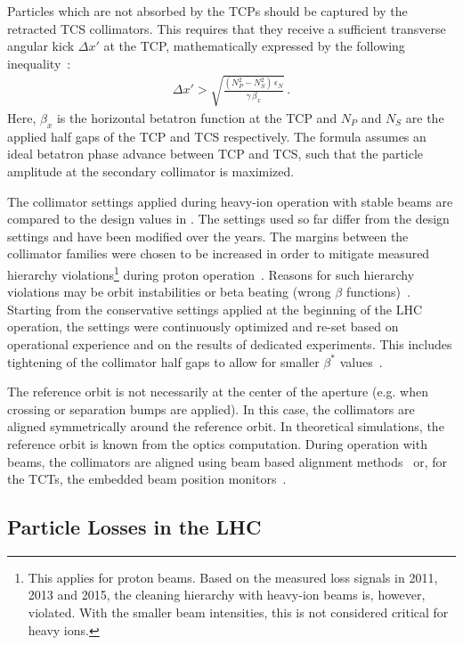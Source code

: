 Particles which are not absorbed by the TCPs should be captured by the retracted TCS collimators. This requires that they receive a sufficient transverse angular kick $\Delta x'$ at the TCP, mathematically expressed by the following inequality~\cite{ICOSIMref02}:
%
\begin{align}
  \Delta x' > \sqrt{\frac{(N_P^2 - N_S^2) \, \epsilon_N }{ \gamma \, \beta_x } } \,. \label{dx:secon}
\end{align}
%
Here, $\beta_x$ is the horizontal betatron function at the TCP and $N_P$ and $N_S$ are the applied half gaps of the TCP and TCS respectively. The formula assumes an ideal betatron phase advance between TCP and TCS, such that the particle amplitude at the secondary collimator is maximized.
%

The collimator settings applied during heavy-ion operation with stable beams are compared to the design values in . The settings used so far differ from the design settings and have been modified over the years. The margins between the collimator families were chosen to be increased in order to mitigate measured hierarchy violations\footnote{This applies for proton beams. Based on the measured loss signals in 2011, 2013 and 2015, the cleaning hierarchy with heavy-ion beams is, however, violated. With the smaller beam intensities, this is not considered critical for heavy ions.} during proton operation~\cite{Bruce2014a}. Reasons for such hierarchy violations may be orbit instabilities or beta beating (wrong $\beta$ functions)~\cite{CERN-ATS-NOTE-2011-036MD}. Starting from the conservative settings applied at the beginning of the LHC operation, the settings were continuously optimized and re-set based on operational experience and on the results of dedicated experiments. This includes tightening of the collimator half gaps to allow for smaller $\beta^*$ values~\cite{CERN-ATS-2013-045}.

The reference orbit is not necessarily at the center of the aperture (e.g. when crossing or separation bumps are applied). In this case, the collimators are aligned symmetrically around the reference orbit. In theoretical simulations, the reference orbit is known from the optics computation. During operation with beams, the collimators are aligned using beam based alignment methods~\cite{ipac2011:thpz034} or, for the TCTs, the embedded beam position monitors~\cite{accnote:150028}.



%
\subsection{Particle Losses in the LHC}
%

